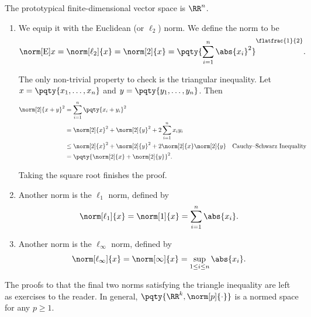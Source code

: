 \begin{example}
    The prototypical finite-dimensional vector space is \(\RR^n\).
    \begin{enumerate}
        \item We equip it with the Euclidean (or \(\ell_2\)) norm. We define the norm to be
        \[
            \norm[\text{E}]{x} = \norm[\ell_2]{x} = \norm[2]{x} = \pqty{\sum_{i = 1}^{n} \abs{x_i}^2}^{\flatfrac{1}{2}}.
        \]

        The only non-trivial property to check is the triangular inequality. Let \(x = \pqty{x_1, \dots, x_n}\) and \(y = \pqty{y_1, \dots, y_n}\). Then
        \begin{align*}
            \norm[2]{x + y}^2 &= \sum_{i = 1}^{n} \pqty{x_i + y_i}^2 \\
            &= \norm[2]{x}^2 + \norm[2]{y}^2 + 2 \sum_{i = 1}^{n} x_i y_i \\
            &\leq \norm[2]{x}^2 + \norm[2]{y}^2 + 2 \norm[2]{x} \norm[2]{y} && \text{Cauchy--Schwarz Inequality}\\
            &= \pqty{\norm[2]{x} + \norm[2]{y}}^2.
        \end{align*}

        Taking the square root finishes the proof.

        \item Another norm is the \(\ell_1\) norm, defined by
        \[
            \norm[\ell_1]{x} = \norm[1]{x} = \sum_{i = 1}^{n} \abs{x_i}.
        \]

        \item Another norm is the \(\ell_\infty\) norm, defined by
        \[
            \norm[\ell_\infty]{x} = \norm[\infty]{x} = \sup_{1 \leq i \leq n}\abs{x_i}.
        \]
    \end{enumerate}

    The proofs to that the final two norms satisfying the triangle inequality are left as exercises to the reader. In general, \(\pqty{\RR^k, \norm[p]{\cdot}}\) is a normed space for any \(p \geq 1\).
\end{example}

